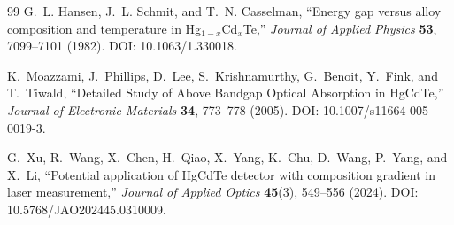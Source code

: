\documentclass[11pt]{article}
\begin{document}
\begin{thebibliography}{99}
G.~L. Hansen, J.~L. Schmit, and T.~N. Casselman, ``Energy gap versus alloy composition and temperature in Hg$_{1-x}$Cd$_x$Te,'' \emph{Journal of Applied Physics} \textbf{53}, 7099--7101 (1982). DOI: 10.1063/1.330018.

K.~Moazzami, J.~Phillips, D.~Lee, S.~Krishnamurthy, G.~Benoit, Y.~Fink, and T.~Tiwald, ``Detailed Study of Above Bandgap Optical Absorption in HgCdTe,'' \emph{Journal of Electronic Materials} \textbf{34}, 773--778 (2005). DOI: 10.1007/s11664-005-0019-3.

G.~Xu, R.~Wang, X.~Chen, H.~Qiao, X.~Yang, K.~Chu, D.~Wang, P.~Yang, and X.~Li, ``Potential application of HgCdTe detector with composition gradient in laser measurement,'' \emph{Journal of Applied Optics} \textbf{45}(3), 549--556 (2024). DOI: 10.5768/JAO202445.0310009.

\end{thebibliography}
\end{document}
